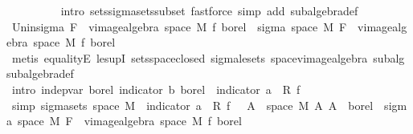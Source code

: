 \begin{isabellebody}
\ \ \ \ \ \ \ \ \isamarkupfalse%
\ {\isacharparenleft}{\kern0pt}intro\ sets{\isachardot}{\kern0pt}sigma{\isacharunderscore}{\kern0pt}sets{\isacharunderscore}{\kern0pt}subset{\isacharprime}{\kern0pt}{\isacharparenright}{\kern0pt}\ {\isacharparenleft}{\kern0pt}fastforce\ simp\ add{\isacharcolon}{\kern0pt}\ subalgebra{\isacharunderscore}{\kern0pt}def{\isacharparenright}{\kern0pt}{\isacharplus}{\kern0pt}\isanewline
\isanewline
\ \ \ \ \ \ \isamarkupfalse%
\ Un{\isacharunderscore}{\kern0pt}in{\isacharunderscore}{\kern0pt}sigma{\isacharcolon}{\kern0pt}\ {\isachardoublequoteopen}F\ {\isasymunion}\ vimage{\isacharunderscore}{\kern0pt}algebra\ {\isacharparenleft}{\kern0pt}space\ M{\isacharparenright}{\kern0pt}\ f\ borel\ {\isasymsubseteq}\ sigma\ {\isacharparenleft}{\kern0pt}space\ M{\isacharparenright}{\kern0pt}\ {\isacharparenleft}{\kern0pt}F\ {\isasymunion}\ vimage{\isacharunderscore}{\kern0pt}algebra\ {\isacharparenleft}{\kern0pt}space\ M{\isacharparenright}{\kern0pt}\ f\ borel{\isacharparenright}{\kern0pt}{\isachardoublequoteclose}\ \isamarkupfalse%
\ {\isacharparenleft}{\kern0pt}metis\ equalityE\ le{\isacharunderscore}{\kern0pt}supI\ sets{\isachardot}{\kern0pt}space{\isacharunderscore}{\kern0pt}closed\ sigma{\isacharunderscore}{\kern0pt}le{\isacharunderscore}{\kern0pt}sets\ space{\isacharunderscore}{\kern0pt}vimage{\isacharunderscore}{\kern0pt}algebra\ subalg\ subalgebra{\isacharunderscore}{\kern0pt}def{\isacharparenright}{\kern0pt}\isanewline
\isanewline
\ \ \ \ \ \ \isamarkupfalse%
\ {\isacharbrackleft}{\kern0pt}intro{\isacharbrackright}{\kern0pt}{\isacharcolon}{\kern0pt}\ {\isachardoublequoteopen}indep{\isacharunderscore}{\kern0pt}var\ borel\ {\isacharparenleft}{\kern0pt}indicator\ b{\isacharparenright}{\kern0pt}\ borel\ {\isacharparenleft}{\kern0pt}{\isasymlambda}{\isasymomega}{\isachardot}{\kern0pt}\ indicator\ a\ {\isasymomega}\ {\isacharasterisk}{\kern0pt}\isactrlsub R\ f\ {\isasymomega}{\isacharparenright}{\kern0pt}{\isachardoublequoteclose}\isanewline
\ \ \ \ \ \ \isamarkupfalse%
\ {\isacharminus}{\kern0pt}\isanewline
\ \ \ \ \ \ \ \ \isamarkupfalse%
\ {\isacharbrackleft}{\kern0pt}simp{\isacharbrackright}{\kern0pt}{\isacharcolon}{\kern0pt}\ {\isachardoublequoteopen}sigma{\isacharunderscore}{\kern0pt}sets\ {\isacharparenleft}{\kern0pt}space\ M{\isacharparenright}{\kern0pt}\ {\isacharbraceleft}{\kern0pt}{\isacharparenleft}{\kern0pt}{\isasymlambda}{\isasymomega}{\isachardot}{\kern0pt}\ indicator\ a\ {\isasymomega}\ {\isacharasterisk}{\kern0pt}\isactrlsub R\ f\ {\isasymomega}{\isacharparenright}{\kern0pt}\ {\isacharminus}{\kern0pt}{\isacharbackquote}{\kern0pt}\ A\ {\isasyminter}\ space\ M\ {\isacharbar}{\kern0pt}A{\isachardot}{\kern0pt}\ A\ {\isasymin}\ borel{\isacharbraceright}{\kern0pt}\ {\isasymsubseteq}\ sigma\ {\isacharparenleft}{\kern0pt}space\ M{\isacharparenright}{\kern0pt}\ {\isacharparenleft}{\kern0pt}F\ {\isasymunion}\ vimage{\isacharunderscore}{\kern0pt}algebra\ {\isacharparenleft}{\kern0pt}space\ M{\isacharparenright}{\kern0pt}\ f\ borel{\isacharparenright}{\kern0pt}{\isachardoublequoteclose}\isanewline

\end{isabellebody}
